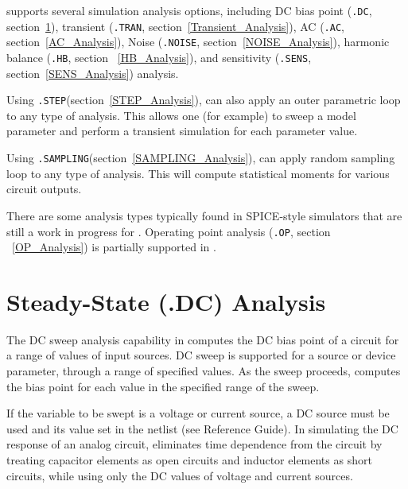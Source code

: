\Xyce{} supports several simulation analysis options, including DC bias point (\texttt{.DC}, section~\ref{DC_Analysis}), transient
(\texttt{.TRAN}, section~\ref{Transient_Analysis}), AC (\texttt{.AC}, section~\ref{AC_Analysis}), Noise (\texttt{.NOISE}, section~\ref{NOISE_Analysis}),
harmonic balance (\texttt{.HB}, section ~\ref{HB_Analysis}), and sensitivity (\texttt{.SENS}, section~\ref{SENS_Analysis}) analysis.

Using \texttt{.STEP}(section~\ref{STEP_Analysis}), \Xyce{} can also apply an outer parametric loop to any type of analysis. This allows one (for example) to sweep a model parameter and perform a transient simulation for each parameter value.

Using \texttt{.SAMPLING}(section~\ref{SAMPLING_Analysis}), \Xyce{} can apply random sampling loop to any type of analysis.   This will compute statistical moments for various circuit outputs.

There are some analysis types typically found in SPICE-style simulators that are still a work in progress for \Xyce{}. Operating point analysis (\texttt{.OP}, section ~\ref{OP_Analysis}) is partially supported in \Xyce{}.

\section{Steady-State (.DC) Analysis}
\label{DC_Analysis}
\label{DC_Sweep_Overview}
 
 

The DC sweep analysis capability in \Xyce{} computes the DC bias point
of a circuit for a range of values of input sources.  DC sweep is
supported for a source or device parameter, through a range of
specified values.  As the sweep proceeds, \Xyce{} computes the bias
point for each value in the specified range of the
sweep.

If the variable to be swept is a voltage or current source, a DC source must be
used and its value set in the netlist (see \Xyce{} Reference 
Guide\ReferenceGuide{}). In simulating the DC response of an analog
circuit, \Xyce{} eliminates time dependence from the circuit by treating capacitor elements as open circuits and inductor elements as short circuits, while using only the DC values of voltage and current sources.


